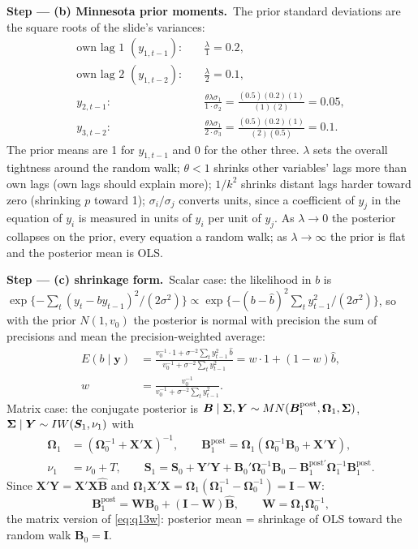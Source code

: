 \documentclass[11pt,a4paper]{article}
\newcommand{\passo}[2]{\par\smallskip\noindent\textbf{Step --- #1.}~#2}
\begin{document}
\begin{sol}
\passo{(b) Minnesota prior moments}{The prior standard deviations are the square roots of the slide's variances:
\begin{align}
\text{own lag 1 } (y_{1,t-1}):&\quad \frac{\lambda}{1}=0.2,\nonumber\\
\text{own lag 2 } (y_{1,t-2}):&\quad \frac{\lambda}{2}=0.1,\nonumber\\
y_{2,t-1}:&\quad \frac{\theta\lambda\sigma_1}{1\cdot\sigma_2}=\frac{(0.5)(0.2)(1)}{(1)(2)}=0.05,\nonumber\\
y_{3,t-2}:&\quad \frac{\theta\lambda\sigma_1}{2\cdot\sigma_3}=\frac{(0.5)(0.2)(1)}{(2)(0.5)}=0.1.\nonumber
\end{align}
The prior means are 1 for $y_{1,t-1}$ and 0 for the other three. $\lambda$ sets the overall tightness around the random
walk; $\theta<1$ shrinks other variables' lags more than own lags (own lags should explain more); $1/k^2$ shrinks
distant lags harder toward zero (shrinking $p$ toward 1); $\sigma_i/\sigma_j$ converts units, since a coefficient of $y_j$ in
the equation of $y_i$ is measured in units of $y_i$ per unit of $y_j$. As $\lambda\to0$ the posterior collapses on the prior,
every equation a random walk; as $\lambda\to\infty$ the prior is flat and the posterior mean is OLS.}

\passo{(c) shrinkage form}{Scalar case: the likelihood in $b$ is
$\exp\{-\sum_t(y_t-by_{t-1})^2/(2\sigma^2)\}\propto\exp\{-(b-\hat b)^2\sum_ty_{t-1}^2/(2\sigma^2)\}$, so with the prior
$N(1,v_0)$ the posterior is normal with precision the sum of precisions and mean the precision-weighted average:
\begin{align}
E(b\mid\bm y)&=\frac{v_0^{-1}\cdot1+\sigma^{-2}\sum_ty_{t-1}^2\,\hat b}{v_0^{-1}+\sigma^{-2}\sum_ty_{t-1}^2}
=w\cdot1+(1-w)\hat b,\label{eq:q13w}\\
w&=\frac{v_0^{-1}}{v_0^{-1}+\sigma^{-2}\sum_ty_{t-1}^2}.\nonumber
\end{align}
Matrix case: the conjugate posterior is $\bm B\mid\bm{\Sigma},\bm Y\sim MN(\bm B_1^{\mathrm{post}},\bm\Omega_1,\bm{\Sigma})$,
$\bm{\Sigma}\mid\bm Y\sim IW(\bm S_1,\nu_1)$ with
\begin{align}
\bm\Omega_1&=(\bm\Omega_0^{-1}+\bm X'\bm X)^{-1},\qquad
\bm B_1^{\mathrm{post}}=\bm\Omega_1(\bm\Omega_0^{-1}\bm B_0+\bm X'\bm Y),\label{eq:q13post}\\
\nu_1&=\nu_0+T,\qquad
\bm S_1=\bm S_0+\bm Y'\bm Y+\bm B_0'\bm\Omega_0^{-1}\bm B_0-\bm B_1^{\mathrm{post}\prime}\bm\Omega_1^{-1}\bm B_1^{\mathrm{post}}.\label{eq:q13S}
\end{align}
Since $\bm X'\bm Y=\bm X'\bm X\hat{\bm B}$ and $\bm\Omega_1\bm X'\bm X=\bm\Omega_1(\bm\Omega_1^{-1}-\bm\Omega_0^{-1})=\bm I-\bm W$:
\begin{equation}
\bm B_1^{\mathrm{post}}=\bm W\bm B_0+(\bm I-\bm W)\hat{\bm B},\qquad \bm W=\bm\Omega_1\bm\Omega_0^{-1},\label{eq:q13W}
\end{equation}
the matrix version of \eqref{eq:q13w}: posterior mean = shrinkage of OLS toward the random walk $\bm B_0=\bm I$.}


\end{sol}
\end{document}

